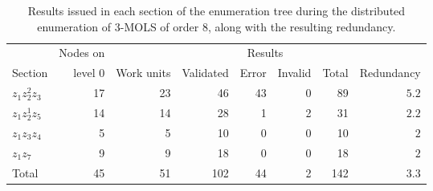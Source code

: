 %
  \begin{table}[htb]
 \centering
 \caption{Results issued in each section of the enumeration tree during the distributed enumeration of 3-MOLS of order 8, along with the resulting redundancy.}
\begin{tabular}{lrrrrrrr}
\toprule
 & Nodes on    &  & \multicolumn{4}{c}{Results} &   \\
\cmidrule(lr){4-7}
Section &level 0 &Work units& Validated & Error  & Invalid & Total &Redundancy      \\ \midrule 
$z_1z_2^2z_3$ & 17& 23&46&43& 0& 89&$5.2$  \\ 
$z_1z_2^1z_5$ &14&14&28&1& 2&31&$2.2$   \\ 
$z_1z_3z_4$& 5&5&10&0&0&10& $2$    \\ 
$z_1z_7$ & 9&9&18&0&0&18&$2$   \\ \midrule
Total &45 &51&102&44&2&142&$3.3$   \\ \bottomrule
\end{tabular}\vspace*{.4cm}
\label{83naivesumm}
\end{table} 
